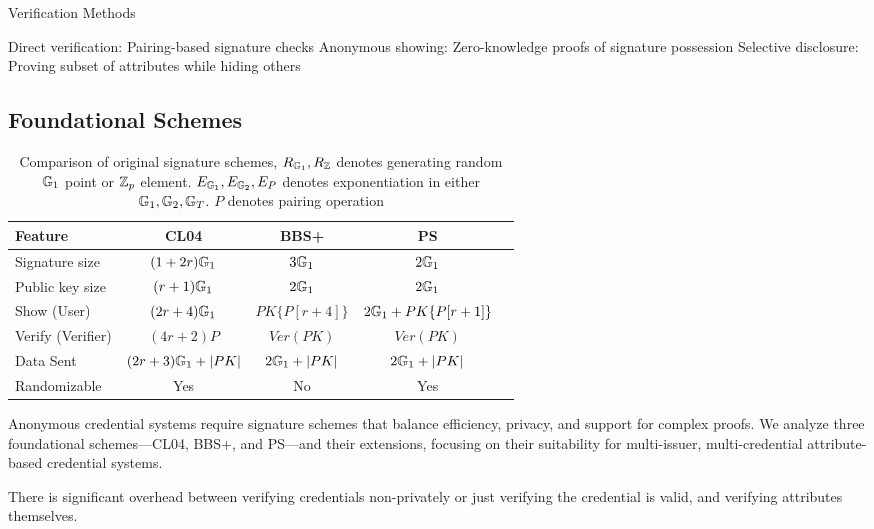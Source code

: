 {Verification Methods


Direct verification: Pairing-based signature checks
Anonymous showing: Zero-knowledge proofs of signature possession
Selective disclosure: Proving subset of attributes while hiding others













\subsection{Foundational Schemes}
\begin{table}[ht]
\centering
\label{tab:original-schemes}
\begin{tabular}{lcccc}
\toprule
\textbf{Feature} & \textbf{CL04} & \textbf{BBS+} & \textbf{PS} \\
\midrule
Signature size & $(1 + 2r)\mathbb{G}_1$ & $3\mathbb{G}_1$ & $2\mathbb{G}_1$ \\
Public key size & $(r+1)\mathbb{G}_1$ & $2\mathbb{G}_1$ & $2\mathbb{G}_1$ \\
Show (User) & $(2r+4)\mathbb{G}_1$ & $PK\{P[r+4]\}$ & $2\mathbb{G}_1 + PK\{P[r+1]\}$ \\
Verify (Verifier) & $(4r+2)P$ & $Ver(PK)$ & $Ver(PK)$ \\
Data Sent & $(2r+3)\mathbb{G}_1 + |PK|$ & $2\mathbb{G}_1 + |PK|$ & $2\mathbb{G}_1 + |PK|$ \\
Randomizable & Yes & No & Yes \\
\bottomrule
\end{tabular}
\caption{Comparison of original signature schemes, $R_{\mathbb{G}_1}, R_{\mathbb{Z}}$ denotes generating random $\mathbb{G}_1$ point or $\mathbb{Z}_p$ element. $E_{\mathbb{G}_1}, E_{\mathbb{G}_2}, E_P$ denotes exponentiation in either $\mathbb{G}_1, \mathbb{G}_2, \mathbb{G}_T$. $P$ denotes pairing operation}
\end{table}






Anonymous credential systems require signature schemes that balance efficiency, privacy, and support for complex proofs. 
We analyze three foundational schemes—CL04, BBS+, and PS—and their extensions, focusing on their suitability for multi-issuer, multi-credential attribute-based credential systems. 

There is significant overhead between verifying credentials non-privately or just verifying the credential is valid, and verifying attributes themselves. 



}
